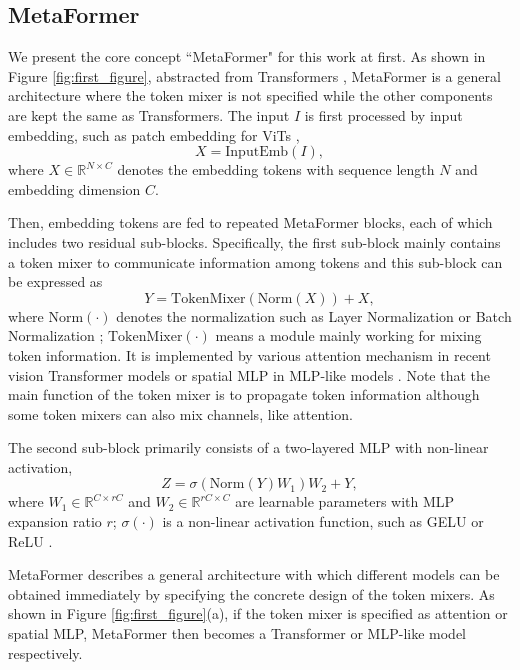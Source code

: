 \subsection{MetaFormer}
We present the core concept ``MetaFormer" for this work at first. As shown in Figure \ref{fig:first_figure}, abstracted from Transformers \cite{transformer}, 
MetaFormer is a general architecture where the token mixer is not specified while the other components are kept the same as Transformers. The input $I$ is first processed by input embedding, such as  patch embedding for ViTs \cite{vit},
\begin{equation}
    X = \mathrm{InputEmb}(I),
\end{equation}
where  $X \in \mathbb{R}^{N \times C}$ denotes the embedding tokens with sequence length $N$ and embedding dimension $C$. 


Then, embedding tokens are fed to repeated MetaFormer blocks, each of which includes two residual sub-blocks. Specifically, the first sub-block mainly contains a token mixer to communicate information among tokens and this sub-block can be expressed as
\begin{equation}
    Y = \mathrm{TokenMixer}(\mathrm{Norm}(X)) + X,
\end{equation}
where $\mathrm{Norm}(\cdot)$ denotes the normalization such as Layer Normalization \cite{layer_norm} or Batch Normalization \cite{batch_norm}; $\mathrm{TokenMixer}(\cdot)$ means a module mainly working for mixing token information. It is implemented by various attention mechanism in recent vision Transformer models  \cite{vit,refiner,t2t} or spatial MLP in MLP-like models \cite{mlp-mixer, resmlp}. Note that the main function of the token mixer is to propagate token information although some token mixers can also mix channels, like attention. 


The second sub-block primarily consists of a two-layered MLP with non-linear activation, 
\begin{equation}
    Z = \sigma(\mathrm{Norm}(Y)W_1)W_2 + Y,
\end{equation}
where $W_1 \in \mathbb{R}^{C \times rC}$ and $W_2 \in \mathbb{R}^{rC \times C}$ are learnable parameters with MLP expansion ratio $r$; $\sigma(\cdot)$ is a non-linear activation function, such as GELU \cite{gelu} or ReLU \cite{relu}. 

 MetaFormer describes a general architecture 
with which different models can be obtained immediately by specifying the concrete design of the token mixers. 
As shown in Figure \ref{fig:first_figure}(a), if the token mixer is specified as attention or spatial MLP, MetaFormer then becomes a Transformer or MLP-like model respectively. 

